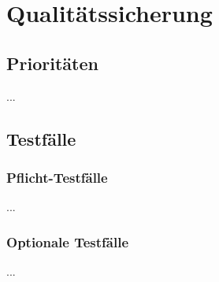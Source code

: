 %
%


\chapter{Qualitätssicherung}
\label{Qualitätssicherung}


\section{Prioritäten}

...
\\


\section{Testfälle}

\subsection*{Pflicht-Testfälle}

...
\\


\subsection*{Optionale Testfälle}

...
\\
